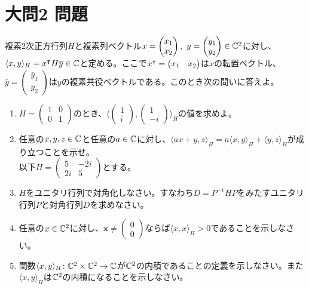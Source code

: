 \documentclass[dvipdfmx]{jsreport}
\begin{document}
\section{大問2 問題}
\begin{tcolorbox} %
    複素2次正方行列$H$と複素列ベクトル$x= \begin{pmatrix}x_1\\ x_2\end{pmatrix},\ y= \begin{pmatrix}y_1\\ y_2\end{pmatrix}\in \mathbb{C}^2$に対し、$\langle{x, y}\rangle_H= {x}^\intercal H\overline{y}\in \mathbb{C}$と定める。ここで${x}^\intercal= \begin{pmatrix}x_1& x_2\end{pmatrix}$は$x$の転置ベクトル、$\bar{y}= \begin{pmatrix}\bar{y}_1\\ \bar{y}_2\end{pmatrix}$は$y$の複素共役ベクトルである。このとき次の問いに答えよ。
\begin{enumerate}
    \item $H= \begin{pmatrix}1& 0\\ 0& 1\end{pmatrix}$のとき、$\langle{\begin{pmatrix}1\\ i\end{pmatrix}, \begin{pmatrix}1\\ -i\end{pmatrix}}\rangle_H$の値を求めよ。
    \item 任意の$x, y, z\in \mathbb{C}$と任意の$a\in \mathbb{C}$に対し、$\langle{ax+ y, z}\rangle_H= a\langle{x, y}\rangle_H+ \langle{y, z}\rangle_H$が成り立つことを示せ。\\
    以下$H= \begin{pmatrix}5& -2i\\ 2i& 5\end{pmatrix}$とする。
    \item $H$をユニタリ行列で対角化しなさい。すなわち$D= P^{-1}HP$をみたすユニタリ行列$P$と対角行列$D$を求めなさい。
    \item 任意の$x\in \mathbb{C}^2$に対し、$\bm{x}\ne \begin{pmatrix}0\\ 0\end{pmatrix}$ならば$\langle{x, x}\rangle_H> 0$であることを示しなさい。
    \item 関数$\langle{x, y}\rangle_H\colon \mathbb{C}^2\times \mathbb{C}^2\to \mathbb{C}$が$\mathbb{C}^2$の内積であることの定義を示しなさい。また$\langle{x, y}\rangle_H$は$\mathbb{C}^2$の内積になることを示しなさい。
\end{enumerate}
\end{tcolorbox} 
\end{document}
